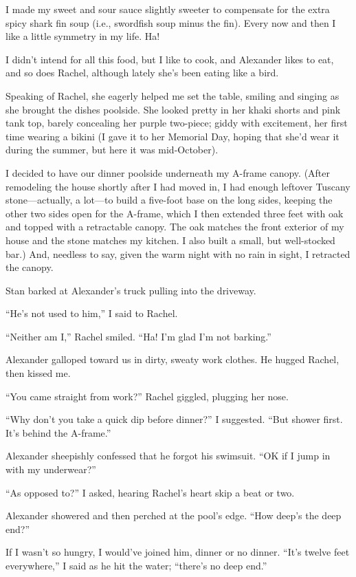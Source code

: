 I made my sweet and sour sauce slightly sweeter to compensate for the
extra spicy shark fin soup (i.e., swordfish soup minus the fin). Every
now and then I like a little symmetry in my life. Ha!

I didn't intend for all this food, but I like to cook, and Alexander
likes to eat, and so does Rachel, although lately she's been eating like
a bird.

Speaking of Rachel, she eagerly helped me set the table, smiling and
singing as she brought the dishes poolside. She looked pretty in her
khaki shorts and pink tank top, barely concealing her purple two-piece;
giddy with excitement, her first time wearing a bikini (I gave it to her
Memorial Day, hoping that she'd wear it during the summer, but here it
was mid-October).

I decided to have our dinner poolside underneath my A-frame canopy.
(After remodeling the house shortly after I had moved in, I had enough
leftover Tuscany stone---actually, a lot---to build a five-foot base on
the long sides, keeping the other two sides open for the A-frame, which
I then extended three feet with oak and topped with a retractable
canopy. The oak matches the front exterior of my house and the stone
matches my kitchen. I also built a small, but well-stocked bar.) And,
needless to say, given the warm night with no rain in sight, I retracted
the canopy.

Stan barked at Alexander's truck pulling into the driveway.

``He's not used to him,'' I said to Rachel.

``Neither am I,'' Rachel smiled. ``Ha! I'm glad I'm not barking.''

Alexander galloped toward us in dirty, sweaty work clothes. He hugged
Rachel, then kissed me.

``You came straight from work?'' Rachel giggled, plugging her nose.

``Why don't you take a quick dip before dinner?'' I suggested. ``But
shower first. It's behind the A-frame.''

Alexander sheepishly confessed that he forgot his swimsuit. ``OK if I
jump in with my underwear?''

``As opposed to?'' I asked, hearing Rachel's heart skip a beat or two.

Alexander showered and then perched at the pool's edge. ``How deep's the
deep end?''

If I wasn't so hungry, I would've joined him, dinner or no dinner.
``It's twelve feet everywhere,'' I said as he hit the water; ``there's
no deep end.''

